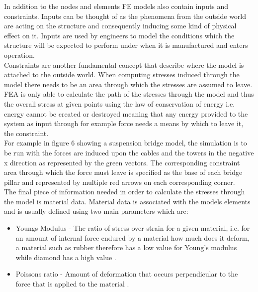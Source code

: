 \noindent
In addition to the nodes and elements FE models also contain inputs and constraints. Inputs can be thought of as the phenomena from the outside world are acting on the structure and consequently inducing some kind of physical effect on it. Inputs are used by engineers to model the conditions which the structure will be expected to perform under when it is manufactured and enters operation. \\


\noindent
Constraints are another fundamental concept that describe where the model is attached to the outside world. When computing stresses induced through the model there needs to be an area through which the stresses are assumed to leave. FEA is only able to calculate the path of the stresses through the model and thus the overall stress at given points using the law of conservation of energy i.e. energy cannot be created or destroyed meaning that any energy provided to the system as input through for example force needs a means by which to leave it, the constraint. \\

\noindent
For example in figure 6 showing a suspension bridge model, the simulation is to be run with the forces are induced upon the cables and the towers in the negative x direction as represented by the green vectors. The corresponding constraint area through which the force must leave is specified as the base of each bridge pillar and represented by multiple red arrows on each corresponding corner.\\

\noindent
The final piece of information needed in order to calculate the stresses through the model is material data. Material data is associated with the models elements and is usually defined using two main parameters which are:

\begin{itemize}
\item Youngs Modulus - The ratio of stress over strain for a given material, i.e. for an amount of internal force endured by a material how much does it deform, a material such as rubber therefore has a low value for Young's modulus while diamond has a high value \cite{YoungsModulus}.

\item Poissons ratio - Amount of deformation that occurs perpendicular to the force that is applied to the material \cite{PossionsRatio}. 
\end{itemize}

